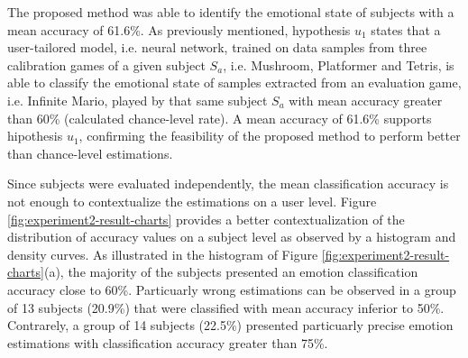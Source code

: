The proposed method was able to identify the emotional state of subjects with a mean accuracy of 61.6\%. As previously mentioned, hypothesis $u_1$ states that a user-tailored model, i.e. neural network, trained on data samples from three calibration games of a given subject $S_a$, i.e. Mushroom, Platformer and Tetris, is able to classify the emotional state of samples extracted from an evaluation game, i.e. Infinite Mario, played by that same subject $S_a$ with mean accuracy greater than 60\% (calculated chance-level rate). A mean accuracy of 61.6\% supports hipothesis $u_1$, confirming the feasibility of the proposed method to perform better than chance-level estimations.

Since subjects were evaluated independently, the mean classification accuracy is not enough to contextualize the estimations on a user level. Figure \ref{fig:experiment2-result-charts} provides a better contextualization of the distribution of accuracy values on a subject level as observed by a histogram and density curves. As illustrated in the histogram of Figure \ref{fig:experiment2-result-charts}(a), the majority of the subjects presented an emotion classification accuracy close to 60\%. Particuarly wrong estimations can be observed in a group of 13 subjects (20.9\%) that were classified with mean accuracy inferior to 50\%. Contrarely, a group of 14 subjects (22.5\%) presented particuarly precise emotion estimations with classification accuracy greater than 75\%.

